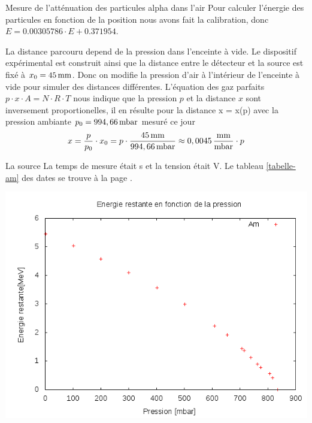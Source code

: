 \documentclass[a4paper,11pt,liststotocnumbered,bibtotocnumbered]{scrartcl}
\begin{document}
 \begin{section}{Mesure de l'atténuation des particules alpha dans l'air}
  Pour calculer l'énergie des particules en fonction de la position nous avons fait la calibration, donc $E=0.00305786  \cdot E +0.371954$.

  La distance parcouru depend de la pression dans l'enceinte à vide. Le dispositif expérimental est construit ainsi que la distance entre le détecteur et la source est fixé à $x_0=\unit[45]{mm}$. Donc on modifie la pression d'air à l'intérieur de l'enceinte à vide pour simuler des distances différentes. L'équation des gaz parfaits $p \cdot x \cdot A =N \cdot R \cdot T$ nous indique que la pression $p$ et la distance $x$ sont inversement proportionelles, il en résulte pour la distance x = x(p) avec la pression ambiante $p_0=\unit[994,66]{mbar}$ mesuré ce jour
   \begin{equation*}
    x=\frac{p}{p_0}\cdot x_0=p\cdot\frac{\unit[45]{mm}}{\unit[994,66]{mbar}}\approx\unit[0,0045]{\frac{mm}{mbar}}\cdot p
   \end{equation*}
  \begin{subsection}{La source }
   La temps de mesure était \unit[20]{s} et la tension était \unit[80]{V}. Le tableau \ref{tabelle-am} des dates se trouve à la page \pageref{tabelle-am}.\\
    \begin{minipage}{0.45\textwidth}
     \includegraphics[width=\textwidth]{Sabine/am_pression.png}
    \end{minipage}
    \hfill
    \begin{minipage}{0.45\textwidth}

\end{minipage}
\end{subsection}
\end{section}
\end{document}
